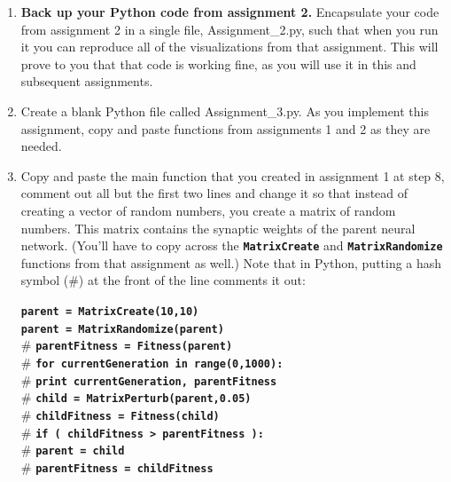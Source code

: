 \documentclass[12pt]{article}
\begin{document}
\begin{enumerate}

\item \textbf{Back up your Python code from assignment 2.} Encapsulate your code from assignment 2 in a single file, Assignment\_2.py, such that when you run it you can reproduce all of the visualizations from that assignment. This will prove to you that that code is working fine, as you will use it in this and subsequent assignments.

\item Create a blank Python file called Assignment\_3.py. As you implement this assignment, copy and paste functions from assignments 1 and 2 as they are needed.

\item Copy and paste the main function that you created in assignment 1 at step 8, comment out all but the first two lines and change it so that instead of creating a vector of random numbers, you create a matrix of random numbers. This matrix contains the synaptic weights of the parent neural network. (You'll have to copy across the \textbf{\texttt{MatrixCreate}} and \textbf{\texttt{MatrixRandomize}} functions from that assignment as well.) Note that in Python, putting a hash symbol (\#) at the front of the line comments it out:

\textbf{\texttt{parent = MatrixCreate(10,10)}}\\
\textbf{\texttt{parent = MatrixRandomize(parent)}}\\
\# \textbf{\texttt{parentFitness = Fitness(parent)}}\\
\# \textbf{\texttt{for currentGeneration in range(0,1000):}}\\
\# \indent \textbf{\texttt{\hspace{1cm}print currentGeneration, parentFitness}}\\
\# \indent \textbf{\texttt{\hspace{1cm}child = MatrixPerturb(parent,0.05)}}\\
\# \indent \textbf{\texttt{\hspace{1cm}childFitness = Fitness(child)}}\\
\# \indent \textbf{\texttt{\hspace{1cm}if ( childFitness > parentFitness ):}}\\
\# \indent \textbf{\texttt{\hspace{2cm}parent = child}}\\
\# \indent \textbf{\texttt{\hspace{2cm}parentFitness = childFitness}}\\


\end{enumerate}
\end{document}
